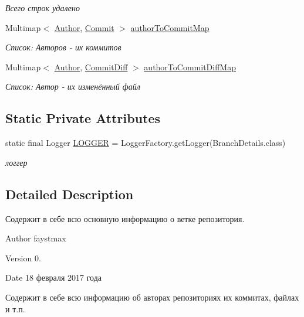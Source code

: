\begin{DoxyCompactItemize}
\begin{DoxyCompactList}\small\item\em Всего строк удалено \end{DoxyCompactList}\item 
Multimap$<$ \hyperlink{classcom_1_1selesse_1_1gitwrapper_1_1myobjects_1_1_author}{Author}, \hyperlink{classcom_1_1selesse_1_1gitwrapper_1_1myobjects_1_1_commit}{Commit} $>$ \hyperlink{classcom_1_1selesse_1_1gitwrapper_1_1analyzer_1_1_branch_details_a7d1d082fec3eff2baa1f51b0682a5088}{author\+To\+Commit\+Map}
\begin{DoxyCompactList}\small\item\em Список\+: Авторов -\/ их коммитов \end{DoxyCompactList}\item 
Multimap$<$ \hyperlink{classcom_1_1selesse_1_1gitwrapper_1_1myobjects_1_1_author}{Author}, \hyperlink{classcom_1_1selesse_1_1gitwrapper_1_1myobjects_1_1_commit_diff}{Commit\+Diff} $>$ \hyperlink{classcom_1_1selesse_1_1gitwrapper_1_1analyzer_1_1_branch_details_a176eae56c354402699cf8ed0288a3a4c}{author\+To\+Commit\+Diff\+Map}
\begin{DoxyCompactList}\small\item\em Список\+: Автор -\/ их изменённый файл \end{DoxyCompactList}\end{DoxyCompactItemize}
\subsection*{Static Private Attributes}
\begin{DoxyCompactItemize}
\item 
static final Logger \hyperlink{classcom_1_1selesse_1_1gitwrapper_1_1analyzer_1_1_branch_details_a3e01cab275214452027bb3e8896c5faf}{L\+O\+G\+G\+ER} = Logger\+Factory.\+get\+Logger(Branch\+Details.\+class)
\begin{DoxyCompactList}\small\item\em логгер \end{DoxyCompactList}\end{DoxyCompactItemize}


\subsection{Detailed Description}
Содержит в себе всю основную информацию о ветке репозитория. 

\begin{DoxyAuthor}{Author}
faystmax 
\end{DoxyAuthor}
\begin{DoxyVersion}{Version}
0. 
\end{DoxyVersion}
\begin{DoxyDate}{Date}
18 февраля 2017 года 
\end{DoxyDate}
Содержит в себе всю информацию об авторах репозиториях их коммитах, файлах и т.\+п. 

